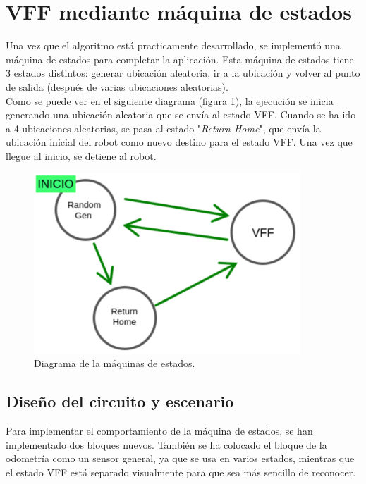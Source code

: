 \section{VFF mediante máquina de estados}
\label{sec:FSM}

Una vez que el algoritmo está practicamente desarrollado, se implementó una máquina de estados para completar la aplicación.
Esta máquina de estados tiene 3 estados distintos: generar ubicación aleatoria, ir a la ubicación y volver al punto de salida
(después de varias ubicaciones aleatorias).\\

Como se puede ver en el siguiente diagrama (figura \ref{fig:FSM_diag}), la ejecución se inicia
generando una ubicación aleatoria que se envía al estado VFF. Cuando se ha ido a 4 ubicaciones aleatorias, se pasa al estado "\textit{Return Home}", que envía la ubicación
inicial del robot como nuevo destino para el estado VFF. Una vez que llegue al inicio, se detiene al robot.

\begin{figure} [H]
    \begin{center}
        \includegraphics[width=10cm]{figs/c6/FSM_diag.png}
    \end{center}
    \caption[Diagrama máquina de estados]{Diagrama de la máquinas de estados.}
    \label{fig:FSM_diag}
\end{figure}

\subsection{Diseño del circuito y escenario}
\label{subsec:dis_bloques_FSM}

Para implementar el comportamiento de la máquina de estados, se han implementado dos bloques nuevos. También se ha colocado el bloque de la odometría
como un sensor general, ya que se usa en varios estados, mientras que el estado VFF está separado visualmente para que sea más sencillo de reconocer.

